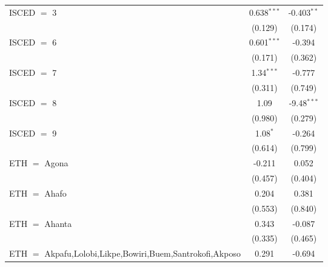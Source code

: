 \begin{table}[htbp!]
\begin{adjustbox}{width = 1\textwidth, max height = 0.95\textheight, center}
\begin{threeparttable}[b]
\begin{tabular}{lcc}
            ISCED $=$ 3                                                               & 0.638$^{***}$ & -0.403$^{**}$\\   
                                                                                      & (0.129)       & (0.174)\\   
            ISCED $=$ 6                                                               & 0.601$^{***}$ & -0.394\\   
                                                                                      & (0.171)       & (0.362)\\   
            ISCED $=$ 7                                                               & 1.34$^{***}$  & -0.777\\   
                                                                                      & (0.311)       & (0.749)\\   
            ISCED $=$ 8                                                               & 1.09          & -9.48$^{***}$\\   
                                                                                      & (0.980)       & (0.279)\\   
            ISCED $=$ 9                                                               & 1.08$^{*}$    & -0.264\\   
                                                                                      & (0.614)       & (0.799)\\   
            ETH $=$ Agona                                                             & -0.211        & 0.052\\   
                                                                                      & (0.457)       & (0.404)\\   
            ETH $=$ Ahafo                                                             & 0.204         & 0.381\\   
                                                                                      & (0.553)       & (0.840)\\   
            ETH $=$ Ahanta                                                            & 0.343         & -0.087\\   
                                                                                      & (0.335)       & (0.465)\\   
            ETH $=$ Akpafu,Lolobi,Likpe,Bowiri,Buem,Santrokofi,Akposo                 & 0.291         & -0.694\\   

\end{tabular}
\end{threeparttable}
\end{adjustbox}
\end{table}
